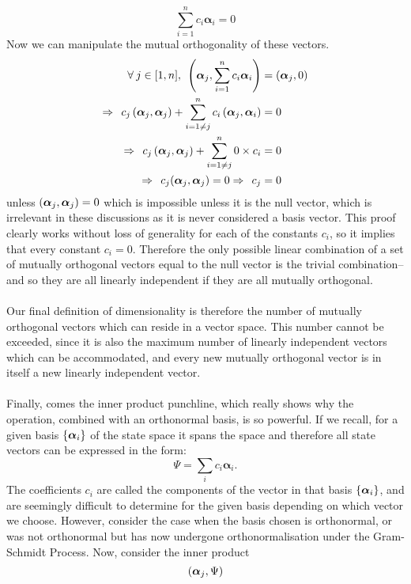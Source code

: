 $$
\sum_{i=1}^{n}c_{i}\bm{\alpha}_{i}=0
$$
Now we can manipulate the mutual orthogonality of these vectors. 
$$
\begin{aligned}
\forall\: j \in [1,n], \:\: \left(\bm{\alpha}_{j},\sum_{i=1}^{n}c_{i}\bm{\alpha}_{i}\right) &=\left(\bm{\alpha}_{j},0\right) \\ 
\Rightarrow\:\:  c_{j}\left(\bm{\alpha}_{j},\bm{\alpha}_{j}\right)+\sum_{i=1\neq j}^{n}c_{i}\left(\bm{\alpha}_{j},\bm{\alpha}_{i}\right) &= 0 \\
\Rightarrow\:\: c_{j}\left(\bm{\alpha}_{j},\bm{\alpha}_{j}\right)+\sum_{i=1\neq j}^{n}0\times c_{i} &= 0 \\ 
\Rightarrow\:\:  c_{j}(\bm{\alpha}_{j},\bm{\alpha}_{j})= 0 \Rightarrow\:\:c_{j} &= 0
\end{aligned}
$$
unless $\left(\bm{\alpha}_{j},\bm{\alpha}_{j}\right)=0$ which is impossible unless it is the null vector, which is irrelevant in these discussions as it is never considered a basis vector. This proof clearly works without loss of generality for each of the constants $c_{i}$, so it implies that every constant $c_{i}=0$. Therefore the only possible linear combination of a set of mutually orthogonal vectors equal to the null vector is the trivial combination-- and so they are all linearly independent if they are all mutually orthogonal.
\\\\
Our final definition of dimensionality is therefore the number of mutually orthogonal vectors which can reside in a vector space. This number cannot be exceeded, since it is also the maximum number of linearly independent vectors which can be accommodated, and every new mutually orthogonal vector is in itself a new linearly independent vector. 
\\\\
Finally, comes the inner product punchline, which really shows why the operation, combined with an orthonormal basis, is so powerful. If we recall, for a given basis $\{\bm{\alpha}_{i}\}$ of the state space it spans the space and therefore all state vectors can be expressed in the form:
$$
\Psi=\sum_{i}c_{i}\bm{\alpha}_{i}.
$$
The coefficients $c_{i}$ are called the components of the vector in that basis $\{\bm{\alpha}_{i}\}$, and are seemingly difficult to determine for the given basis depending on which vector we choose. However, consider the case when the basis chosen is orthonormal, or was not orthonormal but has now undergone orthonormalisation under the Gram-Schmidt Process. Now, consider the inner product
$$
\left(\bm{\alpha}_{j},\Psi\right)
$$
